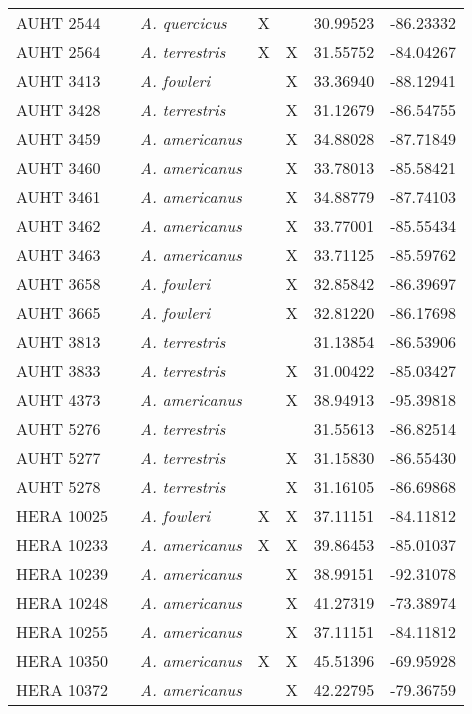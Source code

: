 \begin{longtable}{ lllllll }
AUHT 2544 &  & \textit{A. quercicus} & X &  & 30.99523 & -86.23332 \\ 
AUHT 2564 &  & \textit{A. terrestris} & X & X & 31.55752 & -84.04267 \\ 
AUHT 3413 &  & \textit{A. fowleri} &  & X & 33.36940 & -88.12941 \\ 
AUHT 3428 &  & \textit{A. terrestris} &  & X & 31.12679 & -86.54755 \\ 
AUHT 3459 &  & \textit{A. americanus} &  & X & 34.88028 & -87.71849 \\ 
AUHT 3460 &  & \textit{A. americanus} &  & X & 33.78013 & -85.58421 \\ 
AUHT 3461 &  & \textit{A. americanus} &  & X & 34.88779 & -87.74103 \\ 
AUHT 3462 &  & \textit{A. americanus} &  & X & 33.77001 & -85.55434 \\ 
AUHT 3463 &  & \textit{A. americanus} &  & X & 33.71125 & -85.59762 \\ 
AUHT 3658 &  & \textit{A. fowleri} &  & X & 32.85842 & -86.39697 \\ 
AUHT 3665 &  & \textit{A. fowleri} &  & X & 32.81220 & -86.17698 \\ 
AUHT 3813 &  & \textit{A. terrestris} &  &  & 31.13854 & -86.53906 \\ 
AUHT 3833 &  & \textit{A. terrestris} &  & X & 31.00422 & -85.03427 \\ 
AUHT 4373 &  & \textit{A. americanus} &  & X & 38.94913 & -95.39818 \\ 
AUHT 5276 &  & \textit{A. terrestris} &  &  & 31.55613 & -86.82514 \\ 
AUHT 5277 &  & \textit{A. terrestris} &  & X & 31.15830 & -86.55430 \\ 
AUHT 5278 &  & \textit{A. terrestris} &  & X & 31.16105 & -86.69868 \\ 
HERA 10025 &  & \textit{A. fowleri} & X & X & 37.11151 & -84.11812 \\ 
HERA 10233 &  & \textit{A. americanus} & X & X & 39.86453 & -85.01037 \\ 
HERA 10239 &  & \textit{A. americanus} &  & X & 38.99151 & -92.31078 \\ 
HERA 10248 &  & \textit{A. americanus} &  & X & 41.27319 & -73.38974 \\ 
HERA 10255 &  & \textit{A. americanus} &  & X & 37.11151 & -84.11812 \\ 
HERA 10350 &  & \textit{A. americanus} & X & X & 45.51396 & -69.95928 \\ 
HERA 10372 &  & \textit{A. americanus} &  & X & 42.22795 & -79.36759 \\ 

\end{longtable}
